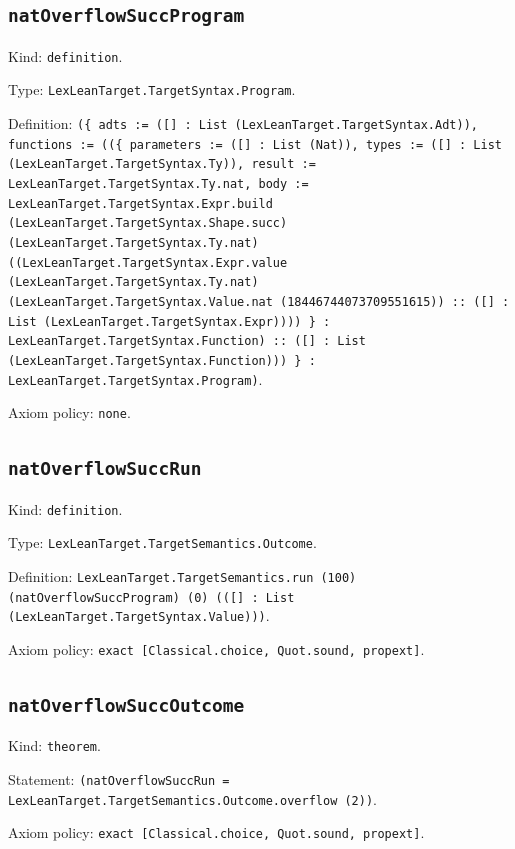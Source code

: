 \documentclass[11pt]{article}
\begin{document}
\subsection*{\texttt{natOverflowSuccProgram}}
\noindent Kind: \texttt{definition}.\par
\noindent Type: \texttt{LexLeanTarget.TargetSyntax.Program}.\par
\noindent Definition: \texttt{(\{ adts := ([] : List (LexLeanTarget.TargetSyntax.Adt)), functions := ((\{ parameters := ([] : List (Nat)), types := ([] : List (LexLeanTarget.TargetSyntax.Ty)), result := LexLeanTarget.TargetSyntax.Ty.nat, body := LexLeanTarget.TargetSyntax.Expr.build (LexLeanTarget.TargetSyntax.Shape.succ) (LexLeanTarget.TargetSyntax.Ty.nat) ((LexLeanTarget.TargetSyntax.Expr.value (LexLeanTarget.TargetSyntax.Ty.nat) (LexLeanTarget.TargetSyntax.Value.nat (18446744073709551615)) :: ([] : List (LexLeanTarget.TargetSyntax.Expr)))) \} : LexLeanTarget.TargetSyntax.Function) :: ([] : List (LexLeanTarget.TargetSyntax.Function))) \} : LexLeanTarget.TargetSyntax.Program)}.\par
\noindent Axiom policy: \texttt{none}.\par
\subsection*{\texttt{natOverflowSuccRun}}
\noindent Kind: \texttt{definition}.\par
\noindent Type: \texttt{LexLeanTarget.TargetSemantics.Outcome}.\par
\noindent Definition: \texttt{LexLeanTarget.TargetSemantics.run (100) (natOverflowSuccProgram) (0) (([] : List (LexLeanTarget.TargetSyntax.Value)))}.\par
\noindent Axiom policy: \texttt{exact [Classical.choice, Quot.sound, propext]}.\par
\subsection*{\texttt{natOverflowSuccOutcome}}
\noindent Kind: \texttt{theorem}.\par
\noindent Statement: \texttt{(natOverflowSuccRun = LexLeanTarget.TargetSemantics.Outcome.overflow (2))}.\par
\noindent Axiom policy: \texttt{exact [Classical.choice, Quot.sound, propext]}.\par
\end{document}
